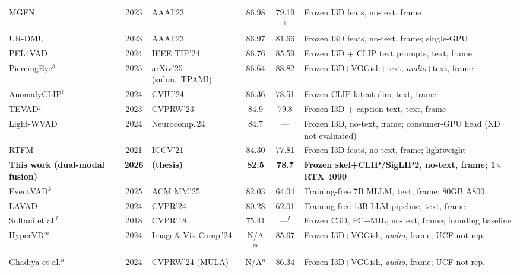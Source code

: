 \begin{table}[p]
{\begin{tabular}{l c l c c l}
MGFN~\cite{chen2023mgfn}                  & 2023 & AAAI'23           & 86.98 & 79.19$^{g}$ & Frozen I3D feats, no-text, frame \\
UR-DMU~\cite{zhou2023urdmu}               & 2023 & AAAI'23           & 86.97 & 81.66 & Frozen I3D feats, no-text, frame; single-GPU \\
PEL4VAD~\cite{pu2024pel4vad}              & 2024 & IEEE TIP'24       & 86.76 & 85.59 & Frozen I3D + CLIP text prompts, text, frame \\
PiercingEye$^{h}$~\cite{leng2026piercingeye} & 2025 & arXiv'25 (subm.\ TPAMI) & 86.64 & 88.82 & Frozen I3D+VGGish+text, \emph{audio}+text, frame \\
AnomalyCLIP$^{i}$~\cite{zanella2024anomalyclip} & 2024 & CVIU'24           & 86.36 & 78.51 & Frozen CLIP latent dirs, text, frame \\
TEVAD$^{j}$~\cite{chen2023tevad}          & 2023 & CVPRW'23          & 84.9  & 79.8  & Frozen I3D + caption text, text, frame \\
Light-WVAD~\cite{wang2024lightwvad}       & 2024 & Neurocomp.'24     & 84.7  & ---   & Frozen I3D, no-text, frame; consumer-GPU head (XD not evaluated) \\
RTFM~\cite{tian2021rtfm}                  & 2021 & ICCV'21           & 84.30 & 77.81 & Frozen I3D feats, no-text, frame; lightweight \\
\textbf{This work (dual-modal fusion)} & \textbf{2026} & \textbf{(thesis)} & \textbf{82.5} & \textbf{78.7} & \textbf{Frozen skel+CLIP/SigLIP2, no-text, frame; 1$\times$RTX 4090} \\
EventVAD$^{k}$~\cite{shao2025eventvad}    & 2025 & ACM MM'25         & 82.03 & 64.04 & Training-free 7B MLLM, text, frame; 80GB A800 \\
LAVAD~\cite{zanella2024lavad}             & 2024 & CVPR'24           & 80.28 & 62.01 & Training-free 13B-LLM pipeline, text, frame \\
Sultani et al.$^{l}$~\cite{sultani2018ucfcrime} & 2018 & CVPR'18           & 75.41 & ---$^{l}$ & Frozen C3D, FC+MIL, no-text, frame; founding baseline \\
HyperVD$^{m}$~\cite{peng2024hypervd}      & 2024 & Image\,\&\,Vis.\,Comp.'24 & N/A$^{m}$ & 85.67 & Frozen I3D+VGGish, \emph{audio}, frame; UCF not rep. \\
Ghadiya et al.$^{n}$~\cite{ghadiya2024crossmodal} & 2024 & CVPRW'24 (MULA)   & N/A$^{n}$ & 86.34 & Frozen I3D+VGGish, \emph{audio}, frame; UCF not rep. \\
\bottomrule
\end{tabular}%
}


\end{table}
